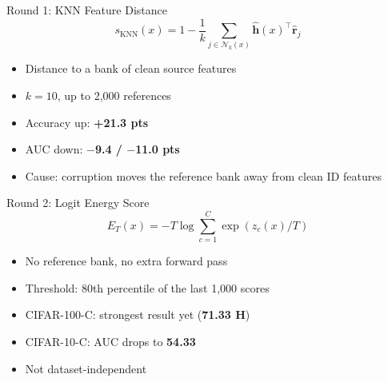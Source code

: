 \documentclass[aspectratio=169,10pt]{beamer}
\begin{document}
\begin{frame}{Round 1: KNN Feature Distance}
  \[
    s_{\mathrm{KNN}}(x) = 1 - \frac{1}{k}\sum_{j\in\mathcal{N}_k(x)} \hat{\mathbf{h}}(x)^{\top}\hat{\mathbf{r}}_j
  \]
  \begin{itemize}
    \setlength\itemsep{2.5mm}
    \item Distance to a bank of clean source features
    \item $k{=}10$, up to 2{,}000 references
  \end{itemize}
  \vspace{5mm}
  \vspace{2mm}
  \begin{itemize}
    \setlength\itemsep{2mm}
    \item Accuracy up: \textbf{\color{Steel}+21.3 pts}
    \item AUC down: \textbf{\color{Orange}$-$9.4 / $-$11.0 pts}
    \item Cause: corruption moves the reference bank away from clean ID features
  \end{itemize}
\end{frame}

\begin{frame}{Round 2: Logit Energy Score}
  \[
    E_T(x) = -T\log\sum_{c=1}^{C}\exp(z_c(x)/T)
  \]
  \begin{itemize}
    \setlength\itemsep{2.5mm}
    \item No reference bank, no extra forward pass
    \item Threshold: 80th percentile of the last 1{,}000 scores
  \end{itemize}
  \vspace{5mm}
  \vspace{2mm}
  \begin{itemize}
    \setlength\itemsep{2mm}
    \item CIFAR-100-C: strongest result yet (\textbf{\color{Steel}71.33 H})
    \item CIFAR-10-C: AUC drops to \textbf{\color{Orange}54.33}
    \item Not dataset-independent
  \end{itemize}
\end{frame}
\end{document}

